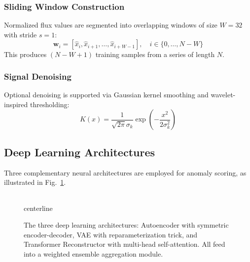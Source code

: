 \documentclass[conference]{IEEEtran}
\begin{document}
\subsubsection{Sliding Window Construction}
Normalized flux values are segmented into overlapping windows of size $W=32$ with stride $s=1$:
\begin{equation}
\mathbf{w}_i = [\hat{x}_i, \hat{x}_{i+1}, \ldots, \hat{x}_{i+W-1}], \quad i \in \{0, \ldots, N-W\}
\end{equation}
This produces $(N - W + 1)$ training samples from a series of length $N$.

\subsubsection{Signal Denoising}
Optional denoising is supported via Gaussian kernel smoothing and wavelet-inspired thresholding:
\begin{equation}
K(x) = \frac{1}{\sqrt{2\pi}\sigma_k} \exp\left(-\frac{x^2}{2\sigma_k^2}\right)
\end{equation}

\subsection{Deep Learning Architectures}

Three complementary neural architectures are employed for anomaly scoring, as illustrated in Fig.~\ref{fig:models}.

\begin{figure}[htbp]
\\centerline{
}
\caption{The three deep learning architectures: Autoencoder with symmetric encoder-decoder, VAE with reparameterization trick, and Transformer Reconstructor with multi-head self-attention. All feed into a weighted ensemble aggregation module.}
\label{fig:models}
\end{figure}
\end{document}
